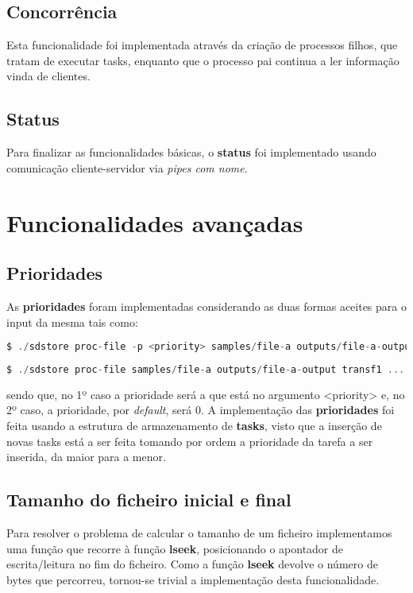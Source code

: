 \documentclass[11pt,a4paper]{report}
\begin{document}
	\subsection{Concorrência}
	Esta funcionalidade foi implementada através da criação de processos filhos, que tratam de executar tasks, enquanto que o processo pai continua a ler informação vinda de clientes.
	
	\subsection{Status}
	Para finalizar as funcionalidades básicas, o \textbf{status} foi implementado usando comunicação cliente-servidor via \textit{pipes com nome}.
	
    \section{Funcionalidades avançadas}
    	
	\subsection{Prioridades}
	As \textbf{prioridades} foram implementadas considerando as duas formas aceites para o input da mesma tais como:
	
    \begin{lstlisting}[language=C,firstnumber=1]
$ ./sdstore proc-file -p <priority> samples/file-a outputs/file-a-output transf1 ...
    \end{lstlisting}
    \begin{lstlisting}[language=C,firstnumber=1]
$ ./sdstore proc-file samples/file-a outputs/file-a-output transf1 ...
    \end{lstlisting}
    sendo que, no 1º caso a prioridade será a que está no argumento <priority> e, no 2º caso, a prioridade, por \textit{default}, será 0.
    A implementação das \textbf{prioridades} foi feita usando a estrutura de armazenamento de \textbf{tasks}, visto que a inserção de novas tasks está a ser feita tomando por ordem a prioridade da tarefa a ser inserida, da maior para a menor.
    
    \subsection{Tamanho do ficheiro inicial e final}
    Para resolver o problema de calcular o tamanho de um ficheiro implementamos uma função que recorre à função \textbf{lseek}, posicionando o apontador de escrita/leitura no fim do ficheiro. Como a função \textbf{lseek} devolve o número de bytes que percorreu, tornou-se trivial a implementação desta funcionalidade.
\end{document}
